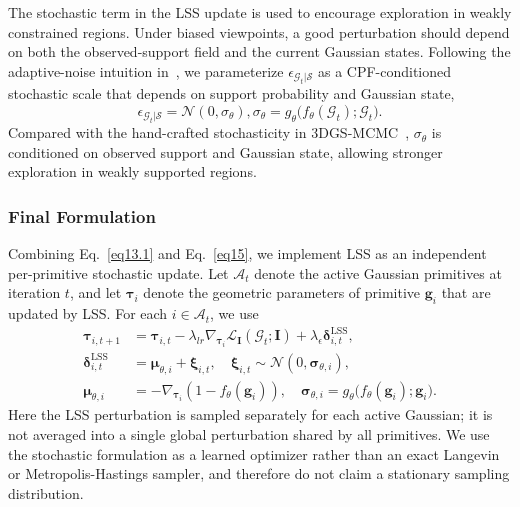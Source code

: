 \documentclass[lettersize,journal]{IEEEtran}
\begin{document}
The stochastic term in the LSS update is used to encourage exploration in weakly constrained regions. 
Under biased viewpoints, a good perturbation should depend on both the observed-support field and the current Gaussian states. 
Following the adaptive-noise intuition in~\cite{sgld2}, we parameterize $\epsilon_{\mathcal{G}_t \vert \mathcal{S}}$ as a CPF-conditioned stochastic scale that depends on support probability and Gaussian state,
\begin{equation}
    \epsilon_{\mathcal{G}_t \vert \mathcal{S}} = \mathcal{N} (0, \sigma_{\theta}), \sigma_{\theta} = g_{\theta}\big(f_{\theta}(\mathcal{G}_t); \mathcal{G}_t\big).
    \label{eq15}
\end{equation}
Compared with the hand-crafted stochasticity in 3DGS-MCMC~\cite{mcmc}, $\sigma_{\theta}$ is conditioned on observed support and Gaussian state, allowing stronger exploration in weakly supported regions.

\subsubsection{Final Formulation}

Combining Eq.~\ref{eq13.1} and Eq.~\ref{eq15}, we implement LSS as an independent per-primitive stochastic update. Let $\mathcal{A}_t$ denote the active Gaussian primitives at iteration $t$, and let $\boldsymbol{\tau}_i$ denote the geometric parameters of primitive $\mathbf{g}_i$ that are updated by LSS. For each $i\in\mathcal{A}_t$, we use
\begin{align}
    \boldsymbol{\tau}_{i,t+1} &= \boldsymbol{\tau}_{i,t} - \lambda_{lr}\nabla_{\boldsymbol{\tau}_i}\mathcal{L}_{\mathbf{I}}(\mathcal{G}_t;\mathbf{I}) + \lambda_{\epsilon}\boldsymbol{\delta}_{i,t}^{\mathrm{LSS}}, \label{eq16}\\
    \boldsymbol{\delta}_{i,t}^{\mathrm{LSS}} &= \boldsymbol{\mu}_{\theta,i} + \boldsymbol{\xi}_{i,t},\quad \boldsymbol{\xi}_{i,t}\sim\mathcal{N}(0,\boldsymbol{\sigma}_{\theta,i}), \label{eq17}\\
    \boldsymbol{\mu}_{\theta,i} &= -\nabla_{\boldsymbol{\tau}_i}\left(1-f_{\theta}(\mathbf{g}_i)\right),\quad
    \boldsymbol{\sigma}_{\theta,i}=g_{\theta}\big(f_{\theta}(\mathbf{g}_i);\mathbf{g}_i\big). \label{eq18}
\end{align}
Here the LSS perturbation is sampled separately for each active Gaussian; it is not averaged into a single global perturbation shared by all primitives. We use the stochastic formulation as a learned optimizer rather than an exact Langevin or Metropolis-Hastings sampler, and therefore do not claim a stationary sampling distribution.
\end{document}
